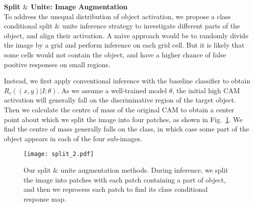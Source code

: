 \documentclass[10pt,twocolumn,letterpaper]{article}
\begin{document}
\noindent\textbf{Split $\&$ Unite: Image Augmentation}\\
\label{sec:split}
To address the unequal distribution of object activation, we propose a class conditional split $\&$ unite inference strategy to investigate different parts of the object, and align their activation.
A naive approach would be to randomly divide the image by a grid and perform inference on each grid cell. But it is likely that some cells would not
contain the object, and have a higher chance of false positive responses on small regions. 


Instead, we first apply conventional inference with the baseline classifier to obtain
$R_c((x,y)|I;\theta)$.
As we assume a well-trained model $\theta$, the initial high CAM activation will generally fall on the discriminative region of the target object. 
Then we calculate the centre of mass of the original CAM to obtain a center point about which we split the image into four patches, as shown in Fig.~\ref{fig:split}. We find the centre of mass generally falls on the class, in which case some part of the object appears 
in each of the four sub-images. 

\begin{figure}[!htb]
   \begin{center}
   {\texttt{[image: split\_2.pdf]}} 
   \end{center}
 \vspace{-3mm}
\caption{Our split $\&$ unite augmentation methods. 
During inference, we split the image into
patches with each patch containing a part of object,
and then we reprocess
each patch to find its
class conditional response map.
}
\vspace{-2mm}
   \label{fig:split}
\end{figure}
\end{document}
